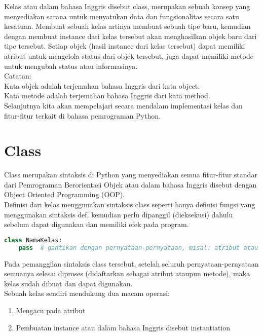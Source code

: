 Kelas atau dalam bahasa Inggris disebut class, merupakan sebuah konsep yang menyediakan sarana untuk menyatukan data dan fungsionalitas secara satu kesatuan. Membuat sebuah kelas artinya membuat sebuah tipe baru, kemudian dengan membuat instance dari kelas tersebut akan menghasilkan objek baru dari tipe tersebut. Setiap objek (hasil instance dari kelas tersebut) dapat memiliki atribut untuk mengelola status dari objek tersebut, juga dapat memiliki metode untuk mengubah status atau informasinya.\\

Catatan:\\

Kata objek adalah terjemahan bahasa Inggris dari kata object.\\

Kata metode adalah terjemahan bahasa Inggris dari kata method.\\
Selanjutnya kita akan mempelajari secara mendalam implementasi kelas dan fitur-fitur terkait di bahasa pemrograman Python.\\

\section{Class}
Class merupakan sintaksis di Python yang menyediakan semua fitur-fitur standar dari Pemrograman Berorientasi Objek atau dalam bahasa Inggris disebut dengan Object Oriented Programming (OOP).\\

Definisi dari kelas menggunakan sintaksis class seperti hanya definisi fungsi yang menggunakan sintaksis def, kemudian perlu dipanggil (dieksekusi) dahulu sebelum dapat digunakan dan memiliki efek pada program.\\
\begin{lstlisting}[language=Python]
class NamaKelas:
    pass  # gantikan dengan pernyataan-pernyataan, misal: atribut atau metode
\end{lstlisting}

Pada pemanggilan sintaksis class tersebut, setelah seluruh pernyataan-pernyataan semuanya selesai diproses (didaftarkan sebagai atribut ataupun metode), maka kelas sudah dibuat dan dapat digunakan.\\

Sebuah kelas sendiri mendukung dua macam operasi:
\begin{enumerate}
\item Mengacu pada atribut
\item Pembuatan instance atau dalam bahasa Inggris disebut instantiation
\end{enumerate}

